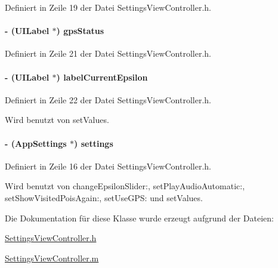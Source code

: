 Definiert in Zeile 19 der Datei SettingsViewController.h.\hypertarget{interface_settings_view_controller_ae0b5b73b9a84ed76b93e76ed7c8f56e3}{
\paragraph[{gpsStatus}]{\setlength{\rightskip}{0pt plus 5cm}-\/ (UILabel $\ast$) gpsStatus}\hfill}
\label{interface_settings_view_controller_ae0b5b73b9a84ed76b93e76ed7c8f56e3}


Definiert in Zeile 21 der Datei SettingsViewController.h.\hypertarget{interface_settings_view_controller_a593ba4073eefd191613782f2eba8aebd}{
\paragraph[{labelCurrentEpsilon}]{\setlength{\rightskip}{0pt plus 5cm}-\/ (UILabel $\ast$) labelCurrentEpsilon}\hfill}
\label{interface_settings_view_controller_a593ba4073eefd191613782f2eba8aebd}


Definiert in Zeile 22 der Datei SettingsViewController.h.

Wird benutzt von setValues.\hypertarget{interface_settings_view_controller_a82f5d348bd9f9f3217da55f84dcc94b1}{
\paragraph[{settings}]{\setlength{\rightskip}{0pt plus 5cm}-\/ ({\bf AppSettings} $\ast$) settings}\hfill}
\label{interface_settings_view_controller_a82f5d348bd9f9f3217da55f84dcc94b1}


Definiert in Zeile 16 der Datei SettingsViewController.h.

Wird benutzt von changeEpsilonSlider:, setPlayAudioAutomatic:, setShowVisitedPoisAgain:, setUseGPS: und setValues.

Die Dokumentation für diese Klasse wurde erzeugt aufgrund der Dateien:\begin{DoxyCompactItemize}
\item 
\hyperlink{_settings_view_controller_8h}{SettingsViewController.h}\item 
\hyperlink{_settings_view_controller_8m}{SettingsViewController.m}\end{DoxyCompactItemize}

